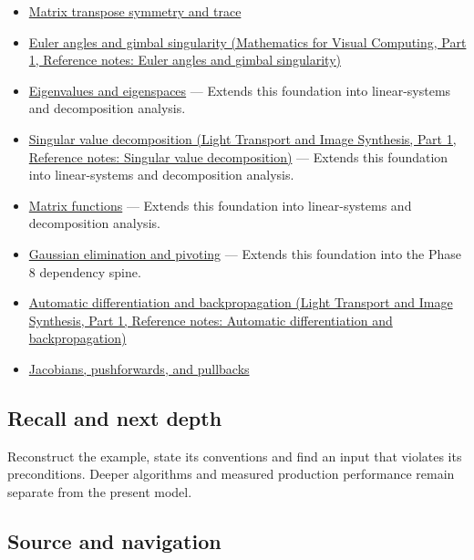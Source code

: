 \hypertarget{appendix-ab31ef447dbf-used-by}{}

\begin{itemize}
\item
  \hyperref[appendix-175ca5ff874d]{Matrix transpose symmetry and trace}
\item
  \href{../02-Mathematics-for-Visual-Computing-P01/main.pdf\#nameddest=appendix-5f723fbd0593}{Euler angles and gimbal singularity (Mathematics for Visual Computing, Part 1, Reference notes: Euler angles and gimbal singularity)}
\item
  \hyperref[appendix-0b3be18411f9]{Eigenvalues and eigenspaces} --- Extends this foundation into linear-systems and decomposition analysis.
\item
  \href{../04-Light-Transport-and-Image-Synthesis-P01/main.pdf\#nameddest=appendix-1fad5e7f36fa}{Singular value decomposition (Light Transport and Image Synthesis, Part 1, Reference notes: Singular value decomposition)} --- Extends this foundation into linear-systems and decomposition analysis.
\item
  \hyperref[appendix-0f4bc2bf2b1f]{Matrix functions} --- Extends this foundation into linear-systems and decomposition analysis.
\item
  \hyperref[appendix-f6e77f4a200f]{Gaussian elimination and pivoting} --- Extends this foundation into the Phase 8 dependency spine.
\item
  \href{../04-Light-Transport-and-Image-Synthesis-P01/main.pdf\#nameddest=appendix-40df0855b4a7}{Automatic differentiation and backpropagation (Light Transport and Image Synthesis, Part 1, Reference notes: Automatic differentiation and backpropagation)}
\item
  \hyperref[appendix-d8a7ddb675eb]{Jacobians, pushforwards, and pullbacks}
\end{itemize}

\subsection{Recall and next depth}\label{appendix-ab31ef447dbf-recall-and-next-depth}

\hypertarget{appendix-ab31ef447dbf-recall-and-next-depth}{}

Reconstruct the example, state its conventions and find an input that violates its preconditions. Deeper algorithms and measured production performance remain separate from the present model.

\subsection{Source and navigation}\label{appendix-ab31ef447dbf-source-and-navigation}

